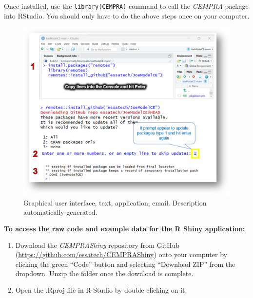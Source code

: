 \documentclass[
  letterpaper,
  DIV=11,
  numbers=noendperiod]{scrreprt}
\begin{document}
Once installed, use the \texttt{library(CEMPRA)} command to call the
\emph{CEMPRA} package into RStudio. You should only have to do the above
steps once on your computer.

\begin{figure}

{\centering \includegraphics{images/image015.png}

}

\caption{\label{fig-picture45}Graphical user interface, text,
application, email. Description automatically generated.}

\end{figure}

\textbf{To access the raw code and example data for the R Shiny
application:}

\begin{enumerate}
\def\labelenumi{\arabic{enumi}.}
\item
  Download the \emph{CEMPRAShiny} repository from GitHub
  (\url{https://github.com/essatech/CEMPRAShiny}) onto your computer by
  clicking the green ``Code'' button and selecting ``Download ZIP'' from
  the dropdown. Unzip the folder once the download is complete.
\item
  Open the .Rproj file in R-Studio by double-clicking on it.
\end{enumerate}
\end{document}
